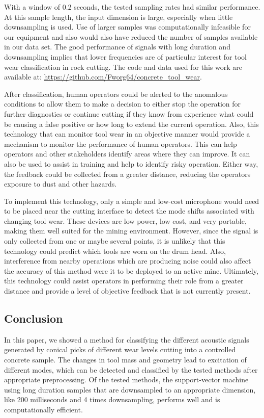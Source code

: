 With a window of 0.2 seconds, the tested sampling rates had similar performance.
At this sample length, the input dimension is large, especially when little downsampling is used.
Use of larger samples was computationally infeasible for our equipment and 
also would also have reduced the number of samples available in our data set.
The good performance of signals with long duration and downsampling
implies that lower frequencies are of particular interest for tool wear classification in rock cutting.
The code and data used for this work are available at:
\url{https://github.com/Fworg64/concrete_tool_wear}.

After classification, human operators could be alerted to the anomalous conditions 
to allow them to make a decision to either stop the operation
for further diagnostics or continue cutting if they know from experience 
what could be causing a false positive or how long to extend the current operation.
Also, this technology that can monitor tool wear in an objective manner
would provide a mechanism to monitor the performance of human operators. 
This can help operators and other stakeholders identify areas where they can improve.
It can also be used to assist in training and help to identify risky operation.
Either way, the feedback could be collected from a greater distance, 
reducing the operators exposure to dust and other hazards.

To implement this technology, only a simple and low-cost microphone would need to be placed near
the cutting interface to detect the mode shifts associated with changing tool wear. These devices
are low power, low cost, and very portable, making them well suited for the mining environment.
However, since the signal is only collected from one or maybe several points, it is unlikely that
this technology could predict which tools are worn on the drum head. Also, interference from nearby
operations which are producing noise could also affect the accuracy of this method were it to be
deployed to an active mine. Ultimately, this technology could assist operators in performing their
role from a greater distance and provide a level of objective feedback that is not currently present.


\subsection{Conclusion}\label{sec13}

In this paper, we showed a method for classifying the different acoustic signals
generated by conical picks of different wear levels cutting into a controlled concrete sample. 
The changes in tool mass and geometry lead to excitation of different modes,
which can be detected and classified by the tested methods after 
appropriate preprocessing. Of the tested methods,
the support-vector machine using long duration samples that are downsampled to an appropriate dimension, 
like 200 milliseconds and 4 times downsampling,
performs well and is computationally efficient.

